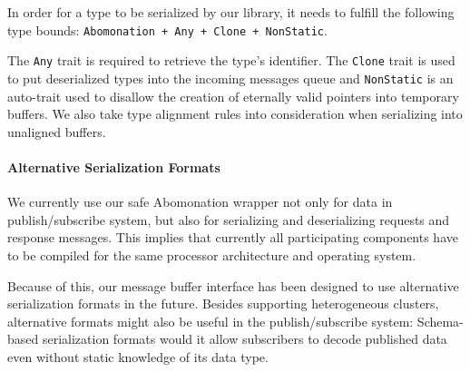 In order for a type to be serialized by our library, it needs to fulfill the
following type bounds: \lstinline{Abomonation + Any + Clone + NonStatic}.

The \lstinline{Any} trait is required to retrieve the type's identifier. The
\lstinline{Clone} trait is used to put deserialized types into the incoming
messages queue and \lstinline{NonStatic} is an auto-trait used to disallow the
creation of eternally valid pointers into temporary buffers. We also take type
alignment rules into consideration when serializing into unaligned buffers. 

\paragraph{Alternative Serialization Formats}

We currently use our safe Abomonation wrapper not only for data in
publish/subscribe system, but also for serializing and deserializing requests
and response messages. This implies that currently all participating components
have to be compiled for the same processor architecture and operating system.

Because of this, our message buffer interface has been designed to use alternative
serialization formats in the future. Besides supporting heterogeneous clusters,
alternative formats might also be useful in the publish/subscribe system:
Schema-based serialization formats would it allow subscribers to decode published
data even without static knowledge of its data type.

